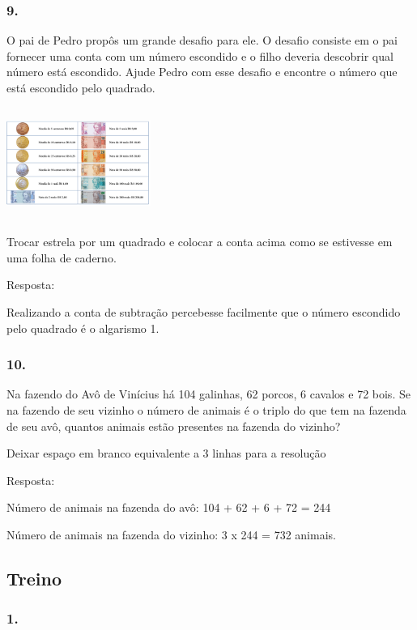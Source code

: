 \subsubsection{9.}\label{section-21}

O pai de Pedro propôs um grande desafio para ele. O desafio consiste em
o pai fornecer uma conta com um número escondido e o filho deveria
descobrir qual número está escondido. Ajude Pedro com esse desafio e
encontre o número que está escondido pelo quadrado.

\includegraphics[width=1.85000in,height=1.43762in]{media/image37.png}

Trocar estrela por um quadrado e colocar a conta acima como se estivesse
em uma folha de caderno.

Resposta:

Realizando a conta de subtração percebesse facilmente que o número
escondido pelo quadrado é o algarismo 1.

\subsubsection{10.}\label{section-22}

Na fazendo do Avô de Vinícius há 104 galinhas, 62 porcos, 6 cavalos e 72
bois. Se na fazendo de seu vizinho o número de animais é o triplo do que
tem na fazenda de seu avô, quantos animais estão presentes na fazenda do
vizinho?

Deixar espaço em branco equivalente a 3 linhas para a resolução

Resposta:

Número de animais na fazenda do avô: 104 + 62 + 6 + 72 = 244

Número de animais na fazenda do vizinho: 3 x 244 = 732 animais.

\subsection{Treino}\label{treino-1}

\subsubsection{1.}\label{section-23}

